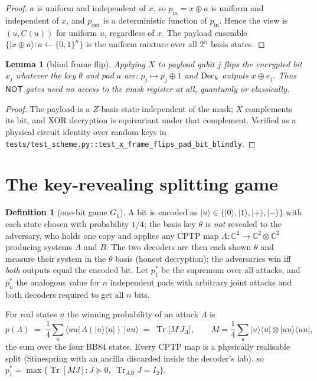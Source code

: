 \documentclass[11pt]{article}
\newtheorem{lemma}[theorem]{Lemma}
\theoremstyle{definition}
\newtheorem{definition}[theorem]{Definition}
\newcommand{\tr}{\operatorname{Tr}}
\begin{document}
\begin{proof}
$a$ is uniform and independent of $x$, so $p_{\mathrm{in}} = x \oplus a$ is
uniform and independent of $x$, and $p_{\mathrm{out}}$ is a deterministic
function of $p_{\mathrm{in}}$.  Hence the view is $(u, C(u))$ for uniform $u$,
regardless of $x$.  The payload ensemble $\{ |x \oplus a\rangle : a
\leftarrow \{0,1\}^n\}$ is the uniform mixture over all $2^n$ basis states.
\end{proof}

\begin{lemma}[blind frame flip]\label{lem:not}
Applying $X$ to payload qubit $j$ flips the encrypted bit $x_j$ whatever the
key $\theta$ and pad $a$ are: $p_j \mapsto p_j \oplus 1$ and
$\operatorname{Dec}_k$ outputs $x \oplus e_j$.  Thus $\mathsf{NOT}$ gates need no access to
the mask register at all, quantumly or classically.
\end{lemma}

\begin{proof}
The payload is a $Z$-basis state independent of the mask; $X$ complements its
bit, and XOR decryption is equivariant under that complement.  Verified as a
physical circuit identity over random keys in\\
\texttt{tests/test\_scheme.py::test\_x\_frame\_flips\_pad\_bit\_blindly}.
\end{proof}

\section{The key-revealing splitting game}\label{sec:game}

\begin{definition}[one-bit game $G_1$]\label{def:game}
A bit is encoded as $|u\rangle \in \{|0\rangle,|1\rangle,|+\rangle,|-\rangle\}$
with each state chosen with probability $1/4$; the basis key $\theta$ is
\emph{not} revealed to the adversary, who holds one copy and applies any CPTP
map $\Lambda: \mathbb{C}^2 \to \mathbb{C}^2 \otimes \mathbb{C}^2$ producing
systems $A$ and $B$.  The two decoders are then each shown $\theta$ and measure
their system in the $\theta$ basis (honest decryption); the adversaries win iff
\emph{both} outputs equal the encoded bit.  Let $p_1^\ast$ be the supremum over
all attacks, and $p_n^\ast$ the analogous value for $n$ independent pads with
arbitrary joint attacks and both decoders required to get all $n$ bits.
\end{definition}

For real states $u$ the winning probability of an attack $\Lambda$ is
\begin{equation}\label{eq:objective}
  p(\Lambda) \;=\; \frac14 \sum_{u} \langle uu|\, \Lambda(|u\rangle\langle u|)\, |uu\rangle
  \;=\; \tr\!\big[M\, J_\Lambda\big], \qquad
  M = \frac14 \sum_u |u\rangle\langle u| \otimes |uu\rangle\langle uu| ,
\end{equation}
the sum over the four BB84 states.  Every CPTP map is a physically realisable
split (Stinespring with an ancilla discarded inside the decoder's lab), so
$p_1^\ast = \max\{\tr[MJ] : J \succeq 0,\ \tr_{AB} J = I_2\}$.
\end{document}
